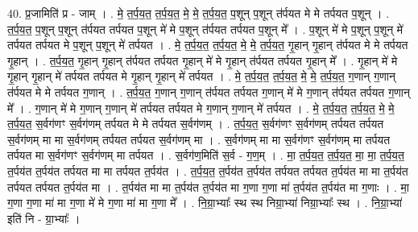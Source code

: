 \documentclass[17pt]{extarticle}
\begin{document}
40. प्र॒जामिति॑ प्र - जाम् । . मे॒ त॒र्प॒य॒त॒ त॒र्प॒य॒त॒ मे॒ मे॒ त॒र्प॒य॒त॒ प॒शून् प॒शून् त॑र्पयत मे मे तर्पयत प॒शून् । . त॒र्प॒य॒त॒ प॒शून् प॒शून् त॑र्पयत तर्पयत प॒शून् मे॑ मे प॒शून् त॑र्पयत तर्पयत प॒शून् मे᳚ । . प॒शून् मे॑ मे प॒शून् प॒शून् मे॑ तर्पयत तर्पयत मे प॒शून् प॒शून् मे॑ तर्पयत । . मे॒ त॒र्प॒य॒त॒ त॒र्प॒य॒त॒ मे॒ मे॒ त॒र्प॒य॒त॒ गृ॒हान् गृ॒हान् त॑र्पयत मे मे तर्पयत गृ॒हान् । . त॒र्प॒य॒त॒ गृ॒हान् गृ॒हान् त॑र्पयत तर्पयत गृ॒हान् मे॑ मे गृ॒हान् त॑र्पयत तर्पयत गृ॒हान् मे᳚ । . गृ॒हान् मे॑ मे गृ॒हान् गृ॒हान् मे॑ तर्पयत तर्पयत मे गृ॒हान् गृ॒हान् मे॑ तर्पयत । . मे॒ त॒र्प॒य॒त॒ त॒र्प॒य॒त॒ मे॒ मे॒ त॒र्प॒य॒त॒ ग॒णान् ग॒णान् त॑र्पयत मे मे तर्पयत ग॒णान् । . त॒र्प॒य॒त॒ ग॒णान् ग॒णान् त॑र्पयत तर्पयत ग॒णान् मे॑ मे ग॒णान् त॑र्पयत तर्पयत ग॒णान् मे᳚ । . ग॒णान् मे॑ मे ग॒णान् ग॒णान् मे॑ तर्पयत तर्पयत मे ग॒णान् ग॒णान् मे॑ तर्पयत । . मे॒ त॒र्प॒य॒त॒ त॒र्प॒य॒त॒ मे॒ मे॒ त॒र्प॒य॒त॒ स॒र्वग॑णꣳ स॒र्वग॑णम् तर्पयत मे मे तर्पयत स॒र्वग॑णम् । . त॒र्प॒य॒त॒ स॒र्वग॑णꣳ स॒र्वग॑णम् तर्पयत तर्पयत स॒र्वग॑णम् मा मा स॒र्वग॑णम् तर्पयत तर्पयत स॒र्वग॑णम् मा । . स॒र्वग॑णम् मा मा स॒र्वग॑णꣳ स॒र्वग॑णम् मा तर्पयत तर्पयत मा स॒र्वग॑णꣳ स॒र्वग॑णम् मा तर्पयत । . स॒र्वग॑ण॒मिति॑ स॒र्व - ग॒ण॒म् । . मा॒ त॒र्प॒य॒त॒ त॒र्प॒य॒त॒ मा॒ मा॒ त॒र्प॒य॒त॒ त॒र्पय॑त त॒र्पय॑त तर्पयत मा मा तर्पयत त॒र्पय॑त । . त॒र्प॒य॒त॒ त॒र्पय॑त त॒र्पय॑त तर्पयत तर्पयत त॒र्पय॑त मा मा त॒र्पय॑त तर्पयत तर्पयत त॒र्पय॑त मा । . त॒र्पय॑त मा मा त॒र्पय॑त त॒र्पय॑त मा ग॒णा ग॒णा मा॑ त॒र्पय॑त त॒र्पय॑त मा ग॒णाः । . मा॒ ग॒णा ग॒णा मा॑ मा ग॒णा मे॑ मे ग॒णा मा॑ मा ग॒णा मे᳚ । . नि॒ग्रा॒भ्याः᳚ स्थ स्थ निग्रा॒भ्या॑ निग्रा॒भ्याः᳚ स्थ । . नि॒ग्रा॒भ्या॑ इति॑ नि - ग्रा॒भ्याः᳚ । \newline
\end{document}
